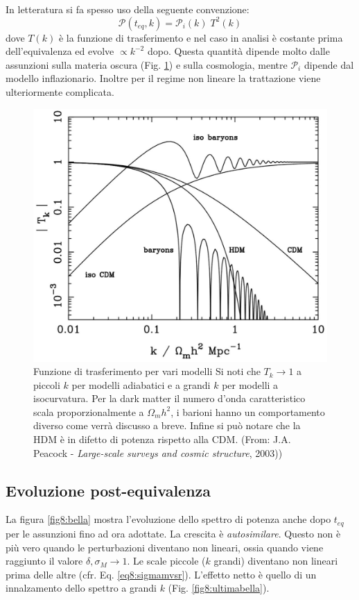 \begin{example} 
    In letteratura si fa spesso uso della seguente convenzione:
    \begin{equation}
        \mathcal{P}(t_{eq},k)=\mathcal{P}_i(k)\; T^2(k)
    \end{equation}
    dove $T(k)$ è la funzione di trasferimento e nel caso in analisi è costante prima dell'equivalenza ed evolve $\propto k^{-2}$ dopo. Questa quantità dipende molto dalle assunzioni sulla materia oscura (Fig. \ref{fig8:transfun}) e sulla cosmologia, mentre $\mathcal{P}_i$ dipende dal modello inflazionario. Inoltre per il regime non lineare la trattazione viene ulteriormente complicata.

\end{example}
\begin{figure}[H]
    \centering
    \includegraphics[width=.53 \textwidth]{Pictures/8/transfun.jpg}
    \vspace*{-1em}
    \caption{Funzione di trasferimento per vari modelli Si noti che $T_k\to 1$ a piccoli $k$ per modelli adiabatici e a grandi $k$ per modelli a isocurvatura. Per la dark matter il numero d'onda caratteristico scala proporzionalmente a $\Omega_m h^2$, i barioni hanno un comportamento diverso come verrà discusso a breve. Infine si può notare che la HDM è in difetto di potenza rispetto alla CDM. (From: J.A. Peacock - \textit{Large-scale surveys and cosmic structure}, 2003))}\label{fig8:transfun} 
\end{figure}



\subsection{Evoluzione post-equivalenza}
La figura \ref{fig8:bella} mostra l'evoluzione dello spettro di potenza anche dopo $t_{eq}$ per le assunzioni fino ad ora adottate. La crescita è \textit{autosimilare}. Questo non è più vero quando le perturbazioni diventano non lineari, ossia quando viene raggiunto il valore $\delta, \sigma_M \to 1$. Le scale piccole ($k$ grandi) diventano non lineari prima delle altre (cfr. Eq. \ref{eq8:sigmamvsr}). L’effetto netto è quello di un innalzamento dello spettro a grandi $k$ (Fig. \ref{fig8:ultimabella}).

